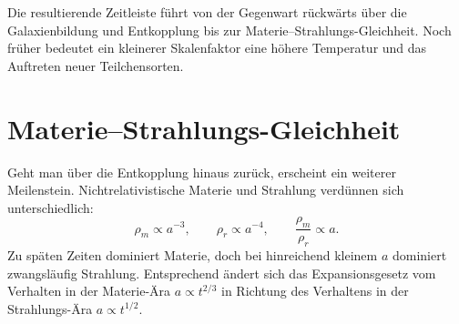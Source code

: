 \begin{classroomqa}
\end{classroomqa}

Die resultierende Zeitleiste führt von der Gegenwart rückwärts über die Galaxienbildung und Entkopplung bis zur Materie--Strahlungs-Gleichheit. Noch früher bedeutet ein kleinerer Skalenfaktor eine höhere Temperatur und das Auftreten neuer Teilchensorten.

\section{Materie--Strahlungs-Gleichheit}

Geht man über die Entkopplung hinaus zurück, erscheint ein weiterer Meilenstein. Nichtrelativistische Materie und Strahlung verdünnen sich unterschiedlich:
\begin{equation}
\rho_m\propto a^{-3},
\qquad
\rho_r\propto a^{-4},
\qquad
\frac{\rho_m}{\rho_r}\propto a.
\label{eq:c07-equality-scaling}
\end{equation}
Zu späten Zeiten dominiert Materie, doch bei hinreichend kleinem \(a\) dominiert zwangsläufig Strahlung. Entsprechend ändert sich das Expansionsgesetz vom Verhalten in der Materie-Ära \(a\propto t^{2/3}\) in Richtung des Verhaltens in der Strahlungs-Ära \(a\propto t^{1/2}\).

